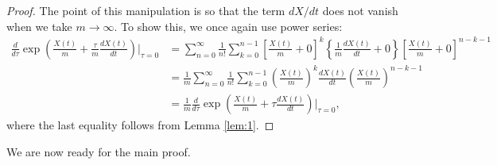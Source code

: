 \documentclass{article}
\theoremstyle{definition}
\newcommand{\f}[2]{\frac{#1}{#2}}
\newcommand{\lp}{\left(}
\newcommand{\rp}{\right)}
\newcommand{\lb}{\left[}
\newcommand{\rb}{\right]}
\newcommand{\lc}{\left\{}
\newcommand{\rc}{\right\}}
\begin{document}
\begin{enumerate}[label=(\alph*)]
	\begin{proof}
		The point of this manipulation is so that the term $dX/dt$ does not vanish when we take $m\to \infty$. To show this, we once again use power series:
		\begin{align*}
		\f{d}{d\tau} \exp\lp \f{X(t)}{m} + \f{\tau}{m} \f{dX(t)}{dt}\rp \bigg\vert_{\tau = 0} 
		&= \sum^\infty_{n=0} \f{1}{n!}\sum^{n-1}_{k=0} \lb \f{X(t)}{m} + 0\rb^k \lc \f{1}{m}\f{dX(t)}{dt} + 0 \rc \lb \f{X(t)}{m} + 0 \rb^{n-k-1} \\
		&= \f{1}{m} \sum^\infty_{n=0} \f{1}{n!}\sum^{n-1}_{k=0} \lp \f{X(t)}{m}\rp^k \f{dX(t)}{dt} \lp \f{X(t)}{m} \rp^{n-k-1} \\
		&= \f{1}{m}\f{d}{d\tau} \exp \lp \f{X(t)}{m} + \tau \f{dX(t)}{dt} \rp\bigg\vert_{\tau=0},
		\end{align*}
		where the last equality follows from Lemma \ref{lem:1}. 
	\end{proof}
	
	We are now ready for the main proof. 
	

\end{enumerate}
\end{document}
